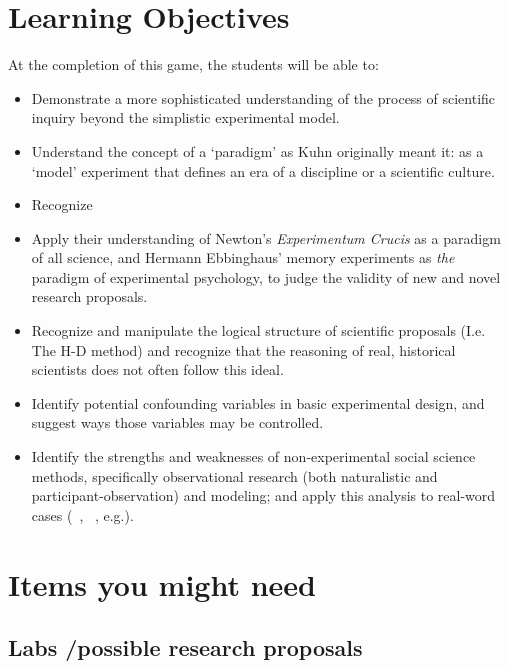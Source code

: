 \begin{refsection}
\section{Learning Objectives}
\label{learningobjectives}

At the completion of this game, the students will be able to:

\begin{itemize}
\item Demonstrate a more sophisticated understanding of the process of scientific inquiry beyond the simplistic experimental model. 

\item Understand the concept of a `paradigm' as Kuhn originally meant it: as a `model' experiment that defines an era of a discipline or a scientific culture.

\item Recognize 

\item Apply their understanding of Newton's \emph{Experimentum Crucis} as a paradigm of all science, and Hermann Ebbinghaus' memory experiments as \emph{the} paradigm of experimental psychology, to judge the validity of new and novel research proposals.

\item Recognize and manipulate the logical structure of scientific proposals (I.e. The H-D method) and recognize that the reasoning of real, historical scientists does not often follow this ideal.

\item Identify potential confounding variables in basic experimental design, and suggest ways those variables may be controlled. 

\item Identify the strengths and weaknesses of non-experimental social science methods, specifically observational research (both naturalistic and participant-observation) and modeling; and apply this analysis to real-word cases (~\citep{Rosenhan:1973uq}, ~\citep{Haney:1973wf}, e.g.).

\end{itemize}

\section{Items you might need}
\label{itemsyoumightneed}

\subsection{Labs \slash  possible research proposals}
\label{labspossibleresearchproposals}


\end{refsection}
